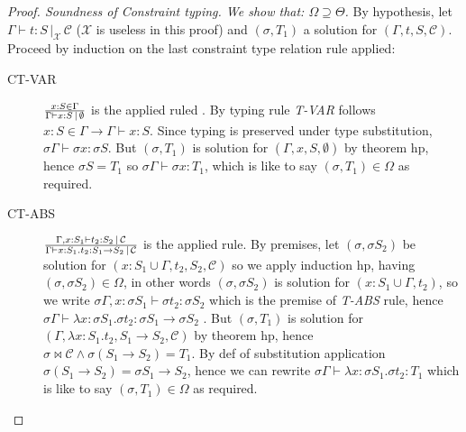 \documentclass[8pt]{beamer}
\begin{document}
\begin{frame}
    \footnotesize
    \begin{proof}[Proof. Soundness of Constraint typing. We show that: 
        $\Omega \supseteq \Theta$]
        By hypothesis, let $\Gamma \vdash t : S \, |_{\mathcal{X}} \,
        \mathcal{C}$ ($\mathcal{X}$ is useless in this proof) and 
        $(\sigma, T_1)$ a solution for $(\Gamma, t, S, \mathcal{C})$.  
        Proceed by induction on the last constraint type relation rule 
        applied:
        \begin{description}
            \item[CT-VAR] ${{x:S\in\Gamma}\over{\Gamma \vdash x:S
                \,|\,\emptyset}}$ is the applied
                ruled .  By typing rule \emph{T-VAR} follows $x:S\in 
                \Gamma \rightarrow \Gamma \vdash x:S$. Since typing is 
                preserved under type substitution, $\sigma\Gamma 
                \vdash \sigma x:\sigma S$.  But $(\sigma, T_1)$ is 
                solution for $(\Gamma, x, S, \emptyset)$ by theorem 
                hp, hence $\sigma S = T_1$ so
                $\sigma \Gamma \vdash \sigma x:T_1$, which is like to 
                say $(\sigma, T_1)\in\Omega$ as required.
            \item[CT-ABS] ${{\Gamma, x:S_1\vdash t_2: S_2 
                \,|\,\mathcal{C}}\over{\Gamma \vdash x:S_1.t_2:S_1 
                \rightarrow S_2 \,|\,\mathcal{C}}}$ is the applied 
                rule.  By premises, let $(\sigma, \sigma S_2)$ be 
                solution for $(x:S_1 \cup \Gamma, t_2, S_2, 
                \mathcal{C})$ so we apply induction hp, having 
                $(\sigma, \sigma S_2) \in \Omega$, in other
                words $(\sigma, \sigma S_2)$ is solution for $(x:S_1 
                \cup \Gamma, t_2)$, so we write $\sigma\Gamma,x:\sigma 
                S_1 \vdash \sigma t_2 : \sigma S_2$ which is the 
                premise of \emph{T-ABS} rule, hence $\sigma \Gamma 
                \vdash \lambda x:\sigma S_1.\sigma t_2: \sigma S_1 
                \rightarrow \sigma S_2$
                . But $(\sigma, T_1)$ is solution for
                $(\Gamma, \lambda x:S_1.t_2, S_1\rightarrow S_2, 
                \mathcal{C})$ by theorem hp, hence $\sigma \Join 
                \mathcal{C} \wedge \sigma (S_1 \rightarrow S_2) = 
                T_1$. By def of substitution application $\sigma (S_1 
                \rightarrow S_2) = \sigma S_1 \rightarrow S_2$, hence
                we can rewrite $\sigma \Gamma \vdash \lambda x:\sigma 
                S_1.\sigma t_2:T_1$ which is like to say $(\sigma, 
                T_1) \in \Omega$ as required.  
                \end{description}
    \end{proof}
    \normalsize
\end{frame}
\end{document}
